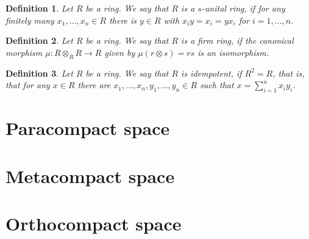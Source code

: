 \documentclass{amsart}
\newtheorem{definition}{Definition}[section]
\begin{document}
\begin{definition}
Let $R$ be a ring. We say that $R$ is a $s$-unital ring, if for any finitely many $x_1,\dots,x_n\in R$ there is $y\in R$ with $x_iy=x_i=yx_i$ for $i=1,\dots,n$.
\end{definition}

\begin{definition}
Let $R$ be a ring. We say that $R$ is a firm ring, if the canonical morphism $\mu\colon R\otimes_R R\longrightarrow R$ given by $\mu(r\otimes s)=rs$ is an isomorphism.
\end{definition}

\begin{definition}
Let $R$ be a ring. We say that $R$ is idempotent, if $R^2=R$, that is, that for any $x\in R$ there are $x_1,\dots,x_n,y_1,\dots,y_n\in R$ such that $x=\sum_{i=1}^nx_iy_i$.
\end{definition}


\section{Paracompact space}

\cite{dieudonne1944generalisation}





\section{Metacompact space}







\section{Orthocompact space}









\end{document}
